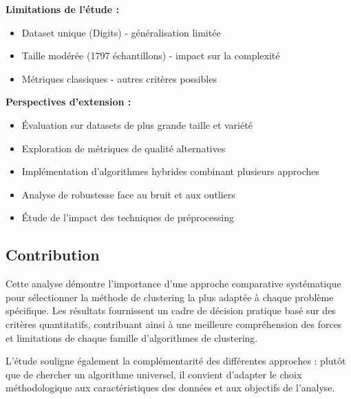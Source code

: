 \documentclass[12pt,a4paper]{article}
\begin{document}
\textbf{Limitations de l'étude :}
\begin{itemize}
    \item Dataset unique (Digits) - généralisation limitée
    \item Taille modérée (1797 échantillons) - impact sur la complexité
    \item Métriques classiques - autres critères possibles
\end{itemize}

\textbf{Perspectives d'extension :}
\begin{itemize}
    \item Évaluation sur datasets de plus grande taille et variété
    \item Exploration de métriques de qualité alternatives
    \item Implémentation d'algorithmes hybrides combinant plusieurs approches
    \item Analyse de robustesse face au bruit et aux outliers
    \item Étude de l'impact des techniques de préprocessing
\end{itemize}

\subsection{Contribution}

Cette analyse démontre l'importance d'une approche comparative systématique pour sélectionner la méthode de clustering la plus adaptée à chaque problème spécifique. Les résultats fournissent un cadre de décision pratique basé sur des critères quantitatifs, contribuant ainsi à une meilleure compréhension des forces et limitations de chaque famille d'algorithmes de clustering.

L'étude souligne également la complémentarité des différentes approches : plutôt que de chercher un algorithme universel, il convient d'adapter le choix méthodologique aux caractéristiques des données et aux objectifs de l'analyse.
\end{document}
